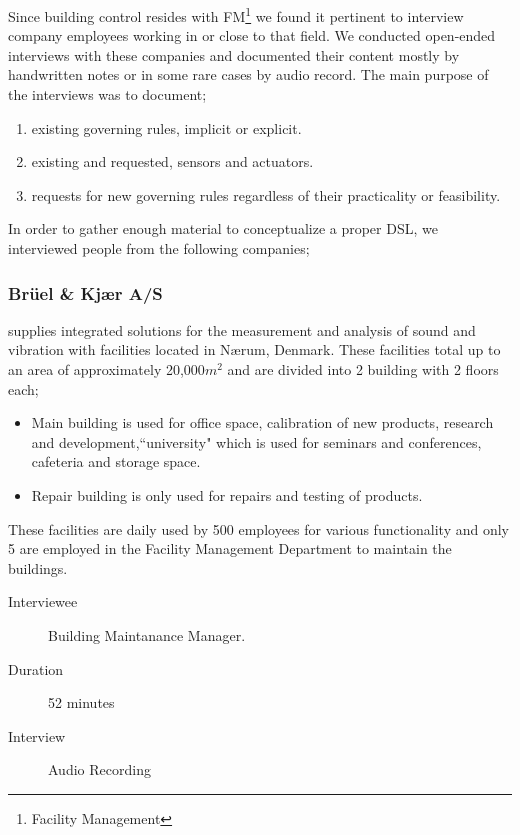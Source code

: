 Since building control resides with FM\footnote{Facility Management} we found it pertinent to interview company employees working in or close to that field. We conducted open-ended interviews with these companies and documented their content mostly by handwritten notes or in some rare cases by audio record. The main purpose of the interviews was to document;

\begin{enumerate}
	\item existing governing rules, implicit or explicit.
	\item existing and requested, sensors and actuators.
	\item requests for new governing rules regardless of their practicality or feasibility.
\end{enumerate}

In order to gather enough material to conceptualize a proper DSL, we interviewed people from the following companies;

\subsubsection{Br\"{u}el \& Kj\ae r A/S} supplies integrated solutions for the measurement and analysis of sound and vibration with facilities located in N\ae rum, Denmark. These facilities total up to an area of approximately 20,000$m^2$ and are divided into 2 building with 2 floors each; 
\begin{itemize}
	\item Main building is used for office space, calibration of new products, research and development,``university" which is used for seminars and conferences, cafeteria and storage space.
	\item Repair building is only used for repairs and testing of products.
\end{itemize}	
These facilities are daily used by 500 employees for various functionality and only 5 are employed in the Facility Management Department to maintain the buildings.
\begin{description}
	\item[Interviewee] Building Maintanance Manager.
	\item[Duration] 52 minutes
	\item[Interview] Audio Recording
\end{description}

